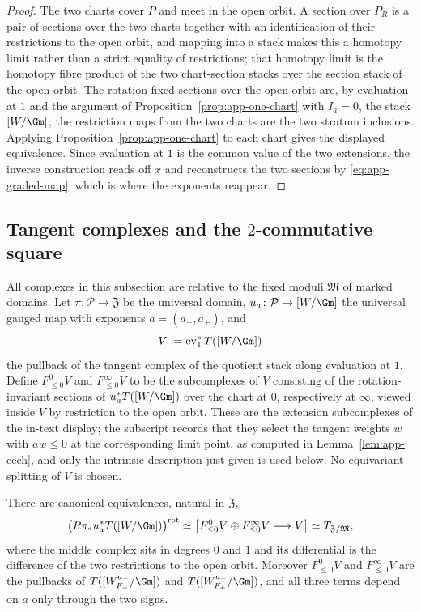 \begin{proof}
The two charts cover \(P\) and meet in the open orbit.  A section over \(P_R\)
is a pair of sections over the two charts together with an identification of
their restrictions to the open orbit, and mapping into a stack makes this a
homotopy limit rather than a strict equality of restrictions; that homotopy
limit is the homotopy fibre product of the two chart-section stacks over the
section stack of the open orbit.  The rotation-fixed sections over the open
orbit are, by evaluation at \(1\) and the argument of
Proposition~\ref{prop:app-one-chart} with \(I_a=0\), the stack \([W/\Gm]\); the
restriction maps from the two charts are the two stratum inclusions.  Applying
Proposition~\ref{prop:app-one-chart} to each chart gives the displayed
equivalence.  Since evaluation at \(1\) is the common value of the two
extensions, the inverse construction reads off \(x\) and reconstructs the two
sections by \eqref{eq:app-graded-map}, which is where the exponents reappear.
\end{proof}

\subsection{Tangent complexes and the
\texorpdfstring{\(2\)-commutative}{2-commutative} square}
\label{app:square}

All complexes in this subsection are relative to the fixed moduli \(\mathfrak
M\) of marked domains.  Let \(\pi\colon\mathcal P\to\mathfrak Z\) be the
universal domain, \(u_a\colon\mathcal P\to[W/\Gm]\) the universal gauged map
with exponents \(a=(a_-,a_+)\), and
\[
 V:=\operatorname{ev}_1^*T([W/\Gm])
\]
the pullback of the tangent complex of the quotient stack along evaluation at
\(1\).  Define \(F^0_{\leq0}V\) and \(F^\infty_{\leq0}V\) to be the subcomplexes
of \(V\) consisting of the rotation-invariant sections of
\(u_a^*T([W/\Gm])\) over the chart at \(0\), respectively at \(\infty\),
viewed inside \(V\) by restriction to the open orbit.  These are the extension
subcomplexes of the in-text display; the subscript records that they select the
tangent weights \(w\) with \(aw\leq0\) at the corresponding limit point, as
computed in Lemma~\ref{lem:app-cech}, and only the intrinsic description just
given is used below.  No equivariant splitting of
\(V\) is chosen.

\begin{lemma}
\label{lem:app-cech}
There are canonical equivalences, natural in \(\mathfrak Z\),
\begin{equation}\label{eq:app-cech}
 \bigl(R\pi_*u_a^*T([W/\Gm])\bigr)^{\mathrm{rot}}
 \simeq
 \bigl[F^0_{\leq0}V\oplus F^\infty_{\leq0}V\longrightarrow V\bigr]
 \simeq
 T_{\mathfrak Z/\mathfrak M},
\end{equation}
where the middle complex sits in degrees \(0\) and \(1\) and its differential
is the difference of the two restrictions to the open orbit.  Moreover
\(F^0_{\leq0}V\) and \(F^\infty_{\leq0}V\) are the pullbacks of
\(T([W_{F_-}^{a_-}/\Gm])\) and \(T([W_{F_+}^{a_+}/\Gm])\), and all three terms
depend on \(a\) only through the two signs.
\end{lemma}

